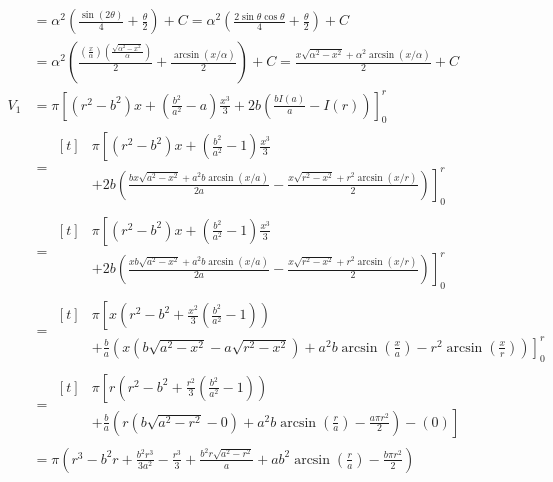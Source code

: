 \documentclass[12pt, A4]{report}
\begin{document}
\begin{enumerate}
\begin{enumerate}
\begin{align*}
									&= \alpha^2\left(\frac{\sin(2\theta)}{4} + \frac{\theta}{2}\right) + C
										= \alpha^2\left(\frac{2\sin\theta\cos\theta}{4} + \frac{\theta}{2}\right) + C \\
									&= \alpha^2\left(\frac{\left(\frac{x}{\alpha}\right)\left(\frac{\sqrt{\alpha^2 - x^2}}{\alpha}\right)}{2} + \frac{\arcsin(x/\alpha)}{2}\right) + C
										= \frac{x\sqrt{\alpha^2 - x^2} + \alpha^2\arcsin(x/\alpha)}{2} + C \\
									V_1 &= \pi\left[(r^2 - b^2)x + \left(\frac{b^2}{a^2} - a\right)\frac{x^3}{3} + 2b\left(\frac{bI(a)}{a} - I(r)\right)\right]_0^r \\
										&= \begin{aligned}[t] &\pi\left[(r^2 - b^2)x + \left(\frac{b^2}{a^2} - 1 \right)\frac{x^3}{3}\right. \\ 
											&\left.+ 2b\left(\frac{bx\sqrt{a^2 - x^2} + a^2b\arcsin(x/a)}{2a} - \frac{x\sqrt{r^2 - x^2} + r^2\arcsin(x/r)}{2}\right)\right]_0^r \end{aligned} \\
										&= \begin{aligned}[t] &\pi\left[(r^2 - b^2)x + \left(\frac{b^2}{a^2} - 1 \right)\frac{x^3}{3}\right. \\ 
											&\left.+ 2b\left(\frac{xb\sqrt{a^2 - x^2} + a^2b\arcsin(x/a)}{2a} - \frac{x\sqrt{r^2 - x^2} + r^2\arcsin(x/r)}{2}\right)\right]_0^r \end{aligned} \\
										&= \begin{aligned}[t]&\pi\left[x\left(r^2 - b^2 + \frac{x^2}{3}\left(\frac{b^2}{a^2} - 1\right)\right)\right. \\ 
											&\left.+ \frac{b}{a}\left(x\left(b\sqrt{a^2 - x^2} - a\sqrt{r^2 - x^2}\right) + a^2b\arcsin\left(\frac{x}{a}\right) - r^2\arcsin\left(\frac{x}{r}\right)\right)\right]_0^r\end{aligned} \\
										&= \begin{aligned}[t]&\pi\left[r\left(r^2 - b^2 + \frac{r^2}{3}\left(\frac{b^2}{a^2} - 1\right) \right)\right. \\ 
											&\left.+ \frac{b}{a}\left(r\left(b\sqrt{a^2 - r^2} - 0\right) + a^2b\arcsin\left(\frac{r}{a}\right) - \frac{a\pi r^2}{2}\right) - (0)\right]\end{aligned}\\
										&= \pi\left(r^3 - b^2r + \frac{b^2r^3}{3a^2} - \frac{r^3}{3} + \frac{b^2r\sqrt{a^2 - r^2}}{a} + ab^2\arcsin\left(\frac{r}{a}\right) - \frac{b\pi r^2}{2}\right) \\

\end{align*}
\end{enumerate}
\end{enumerate}
\end{document}
